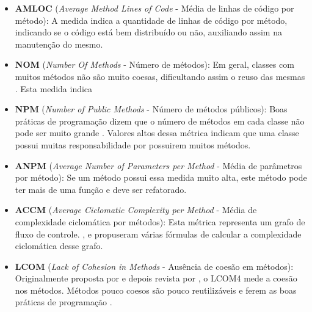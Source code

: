 \begin{itemize}
\item \textbf{AMLOC }(\textit{Average Method Lines of Code} - Média de linhas de código por método): A medida indica a quantidade de linhas de código por método, indicando se o código está bem distribuído ou não, auxiliando assim na manutenção do mesmo.
\item \textbf{NOM }(\textit{Number Of Methods} - Número de métodos): Em geral, classes com muitos métodos não são muito coesas, dificultando assim o reuso das mesmas \cite{lorenzkidd}. Esta medida indica
\item \textbf{NPM }(\textit{Number of Public Methods} - Número de métodos públicos): Boas práticas de programação dizem que o número de métodos em cada classe não pode ser muito grande \cite{beck}. Valores altos dessa métrica indicam que uma classe possui muitas responsabilidade por possuirem muitos métodos.
\item \textbf{ANPM }(\textit{Average Number of Parameters per Method} - Média de parâmetros por método): Se um método possui essa medida muito alta, este método pode ter mais de uma função e deve ser refatorado.
\item \textbf{ACCM }(\textit{Average Ciclomatic Complexity per Method} - Média de complexidade ciclomática por métodos): Esta métrica representa um grafo de fluxo de controle. ,  e  propuseram várias fórmulas de calcular a complexidade ciclomática desse grafo.
\item \textbf{LCOM }(\textit{Lack of Cohesion in Methods} - Ausência de coesão em métodos): Originalmente proposta por  e depois revista por , o LCOM4 mede a coesão nos métodos. Métodos pouco coesos são pouco reutilizáveis e ferem as boas práticas de programação \cite{beck}.
\end{itemize}
